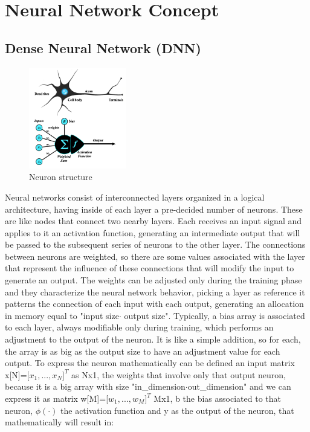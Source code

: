 \section{Neural Network Concept}
\subsection{Dense Neural Network (DNN)}
\begin{figure}
  \begin{center}
    \includegraphics[width=0.38\textwidth]{images/2.04 Neuron.png}
  \end{center}
  \caption{Neuron structure}
\end{figure}
Neural networks consist of interconnected layers organized in a logical architecture, having inside of each layer a pre-decided number of neurons\cite{neural_network_theory}. These are like nodes that connect two nearby layers. Each receives an input signal and applies to it an activation function, generating an intermediate output that will be passed to the subsequent series of neurons to the other layer. The connections between neurons are weighted, so there are some values associated with the layer that represent the influence of these connections that will modify the input to generate an output. The weights can be adjusted only during the training phase and they characterize the neural network behavior, picking a layer as reference it patterns the connection of each input with each output, generating an allocation in memory equal to "input size$\cdot$ output size". Typically, a bias array is associated to each layer, always modifiable only during training, which performs an adjustment to the output of the neuron. It is like a simple addition, so for each, the array is as big as the output size to have an adjustment value for each output.\newline
To express the neuron mathematically can be defined an input matrix x[N]=[$x_1,...,x_N$$]^T$ as
Nx1, the weights that involve only that output neuron, because it is a big array with size "in\_dimension$\cdot$out\_dimension" and we can express it as matrix w[M]=[$w_1,...,w_M$$]^T$  Mx1, b the bias associated to that neuron, $\phi(\cdot)$ the activation function and y as the output of the neuron, that mathematically will result in:
